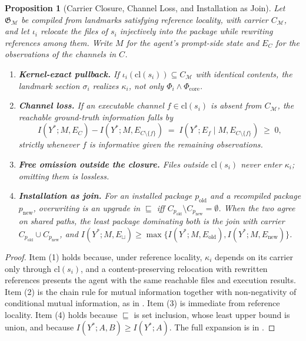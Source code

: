\documentclass[11pt]{article}
\theoremstyle{definition}
\theoremstyle{plain}
\newtheorem{proposition}{Proposition}
\newcommand{\Mcal}{\mathcal{M}}
\newcommand{\Gfrak}{\mathfrak{G}}
\newcommand{\Phicore}{\Phi_{\mathrm{core}}}
\begin{document}
\begin{proposition}[Carrier Closure, Channel Loss, and Installation as Join]
\label{prop:carrier}
Let $\Gfrak_{\Mcal}$ be compiled from landmarks satisfying reference locality, with carrier $C_{\Mcal}$, and let $\iota_i$ relocate the files of $s_i$ injectively into the package while rewriting references among them. Write $M$ for the agent's prompt-side state and $E_C$ for the observations of the channels in $C$.
\begin{enumerate}[leftmargin=1.8em,itemsep=1pt,topsep=2pt]
  \item \textbf{Kernel-exact pullback.} If $\iota_i(\mathrm{cl}(s_i)) \subseteq C_{\Mcal}$ with identical contents, the landmark section $\sigma_i$ realizes $\kappa_i$, not only $\Phi_i \land \Phicore$.
  \item \textbf{Channel loss.} If an executable channel $f \in \mathrm{cl}(s_i)$ is absent from $C_{\Mcal}$, the reachable ground-truth information falls by
  \begin{equation}
    I(Y^*; M, E_{C}) - I(Y^*; M, E_{C \setminus \{f\}}) \;=\; I(Y^*; E_f \mid M, E_{C \setminus \{f\}}) \;\ge\; 0,
    \label{eq:channel-loss}
  \end{equation}
  strictly whenever $f$ is informative given the remaining observations.
  \item \textbf{Free omission outside the closure.} Files outside $\mathrm{cl}(s_i)$ never enter $\kappa_i$; omitting them is lossless.
  \item \textbf{Installation as join.} For an installed package $p_{\mathrm{old}}$ and a recompiled package $p_{\mathrm{new}}$, overwriting is an upgrade in $\sqsubseteq$ iff $C_{p_{\mathrm{old}}} \setminus C_{p_{\mathrm{new}}} = \emptyset$. When the two agree on shared paths, the least package dominating both is the join with carrier $C_{p_{\mathrm{old}}} \cup C_{p_{\mathrm{new}}}$, and $I(Y^*; M, E_{\sqcup}) \ge \max\{I(Y^*; M, E_{\mathrm{old}}), I(Y^*; M, E_{\mathrm{new}})\}$.
\end{enumerate}
\end{proposition}

\begin{proof}
Item (1) holds because, under reference locality, $\kappa_i$ depends on its carrier only through $\mathrm{cl}(s_i)$, and a content-preserving relocation with rewritten references presents the agent with the same reachable files and execution results. Item (2) is the chain rule for mutual information together with non-negativity of conditional mutual information, as in . Item (3) is immediate from reference locality. Item (4) holds because $\sqsubseteq$ is set inclusion, whose least upper bound is union, and because $I(Y^*; A, B) \ge I(Y^*; A)$. The full expansion is in .
\end{proof}
\end{document}
